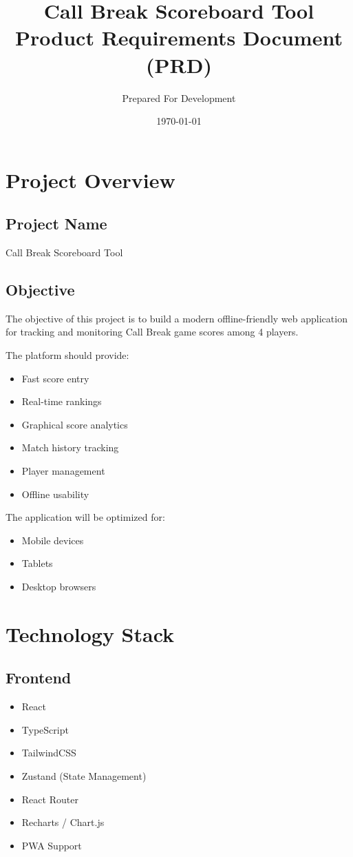 \documentclass[11pt,a4paper]{article}
\title{
    \Huge \textbf{Call Break Scoreboard Tool}\\
    \Large Product Requirements Document (PRD)
}
\author{Prepared For Development}
\date{\today}
\begin{document}
\maketitle
\tableofcontents
\newpage

\section{Project Overview}

\subsection{Project Name}
Call Break Scoreboard Tool

\subsection{Objective}

The objective of this project is to build a modern offline-friendly web application for tracking and monitoring Call Break game scores among 4 players.

The platform should provide:
\begin{itemize}
    \item Fast score entry
    \item Real-time rankings
    \item Graphical score analytics
    \item Match history tracking
    \item Player management
    \item Offline usability
\end{itemize}

The application will be optimized for:
\begin{itemize}
    \item Mobile devices
    \item Tablets
    \item Desktop browsers
\end{itemize}

\section{Technology Stack}

\subsection{Frontend}
\begin{itemize}
    \item React
    \item TypeScript
    \item TailwindCSS
    \item Zustand (State Management)
    \item React Router
    \item Recharts / Chart.js
    \item PWA Support
\end{itemize}
\end{document}

